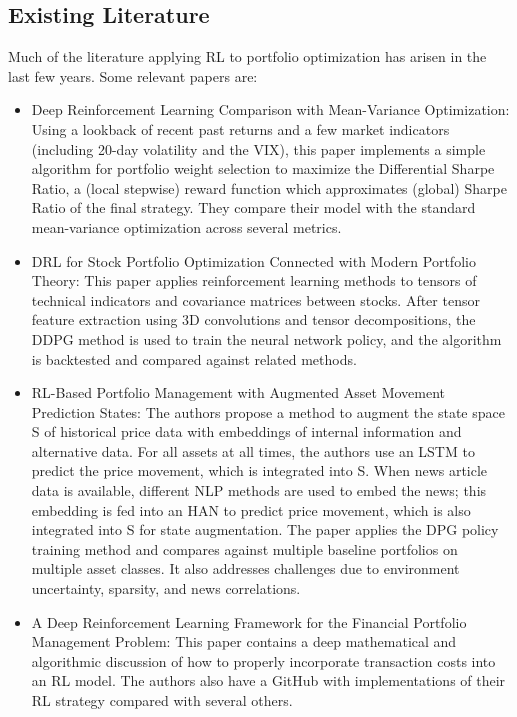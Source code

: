 \subsection{Existing Literature}

Much of the literature applying RL to portfolio optimization has arisen in the 
last few years. Some relevant papers are:

\begin{itemize}

\item \cite{drl_mvo} Deep Reinforcement Learning Comparison with Mean-Variance Optimization: 
Using a lookback of recent past returns and a few market indicators 
(including 20-day volatility and the VIX), this paper implements a simple 
algorithm for portfolio weight selection to maximize the Differential Sharpe Ratio, 
a (local stepwise) reward function which approximates (global) Sharpe Ratio of the 
final strategy. They compare their model with the standard mean-variance 
optimization across several metrics.

\item \cite{drl_modern_portfolio_theory} DRL for Stock Portfolio Optimization Connected with Modern 
Portfolio Theory: This paper applies reinforcement learning methods to 
tensors of technical indicators and covariance matrices between stocks. 
After tensor feature extraction using 3D convolutions and tensor decompositions, 
the DDPG method is used to train the neural network policy, and the algorithm 
is backtested and compared against related methods.
 
\item \cite{rl_augmented_states} RL-Based Portfolio Management with Augmented Asset Movement Prediction 
States: The authors propose a method to augment the state space S of historical 
price data with embeddings of internal information and alternative data. 
For all assets at all times, the authors use an LSTM to predict the price movement,
which is integrated into S. When news article data is available, different NLP methods 
are used to embed the news; this embedding is fed into an HAN to predict price 
movement, which is also integrated into S for state augmentation. The paper applies 
the DPG policy training method and compares against multiple baseline portfolios on 
multiple asset classes. It also addresses challenges due to environment uncertainty, 
sparsity, and news correlations.

\item \cite{drl_framework} A Deep Reinforcement Learning Framework for the Financial Portfolio Management Problem: 
This paper contains a deep mathematical and algorithmic discussion of how to properly incorporate 
transaction costs into an RL model. The authors also have a GitHub with implementations of their 
RL strategy compared with several others.


\end{itemize}
